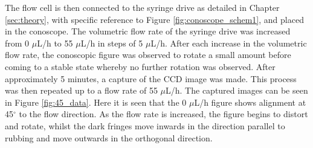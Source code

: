 The flow cell is then connected to the syringe drive as detailed in Chapter \ref{sec:theory}, with specific reference to Figure \ref{fig:conoscope_schem1}, and placed in the conoscope. The volumetric flow rate of the syringe drive was increased from 0 $\mu$L/h to 55 $\mu$L/h in steps of 5 $\mu$L/h. After each increase in the volumetric flow rate, the conoscopic figure was observed to rotate a small amount before coming to a stable state whereby no further rotation was observed. After approximately 5 minutes, a capture of the CCD image was made. This process was then repeated up to a flow rate of 55 $\mu$L/h. The captured images can be seen in Figure \ref{fig:45_data}. Here it is seen that the 0 $\mu$L/h figure shows alignment at 45$^{\circ}$ to the flow direction. As the flow rate is increased, the figure begins to distort and rotate, whilst the dark fringes move inwards in the direction parallel to rubbing and move outwards in the orthogonal direction.

